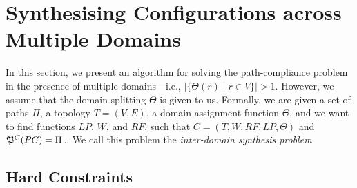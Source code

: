 \section{Synthesising Configurations across Multiple Domains}
\label{sec:synth-multi}

In this section, we present an algorithm for 
solving the path-compliance problem in the presence
of multiple domains---i.e., $|\{\Theta(r) \mid r\in V\}|>1$.
However, we assume that the domain splitting $\Theta$ is given to us.
Formally, we are given a set of paths $\Pi$,
a topology $T=(V,E)$,
a domain-assignment function $\Theta$, 
and we want to find functions
$LP$, $W$, and $RF$,  such that
$C=(T,W,RF,LP,\Theta)$ and
$\mathfrak{P}^C(PC) = \Pi$..
We call this problem the \emph{inter-domain synthesis problem}.

\subsection{Hard Constraints}
\begin{figure}
	\centering
\end{figure}


